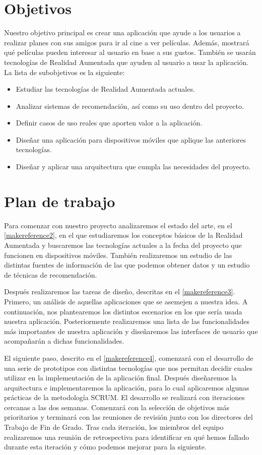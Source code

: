\section{Objetivos}
\label{makereference1.2}
Nuestro objetivo principal es crear una aplicación que ayude a los usuarios a
realizar planes con sus amigos para ir al cine a ver películas. Además,
mostrará qué películas pueden interesar al usuario en base a sus gustos.
También se usarán tecnologías de Realidad Aumentada que ayuden al usuario a usar
la aplicación.
La lista de subobjetivos es la siguiente:
\begin{itemize}  
    \item Estudiar las tecnologías de Realidad Aumentada actuales.
    \item Analizar sistemas de recomendación, así como su uso dentro del
     proyecto.
    \item Definir casos de uso reales que aporten valor a la aplicación.
    \item Diseñar una aplicación para dispositivos móviles que aplique las
     anteriores tecnologías.
    \item Diseñar y aplicar una arquitectura que cumpla las necesidades del
     proyecto.
\end{itemize}

\section{Plan de trabajo}
\label{makereference1.3}

Para comenzar con nuestro proyecto analizaremos el estado del arte, en el
 \autoref{makereference2}, en el que estudiaremos los conceptos básicos de la
 Realidad Aumentada y buscaremos las tecnologías actuales a la fecha del proyecto
 que funcionen en dispositivos móviles. También realizaremos un estudio de las distintas
 fuentes de información de las que podemos obtener datos y un estudio de
 técnicas de recomendación.

Después realizaremos las tareas de diseño, descritas en el
 \autoref{makereference3}. Primero, un análisis de aquellas aplicaciones que se
 asemejen a nuestra idea. A continuación, nos plantearemos los distintos
 escenarios en los que sería usada nuestra aplicación. Posteriormente
 realizaremos una lista de las funcionalidades más importantes de nuestra
 aplicación y diseñaremos las interfaces de usuario que acompañarán a dichas
 funcionalidades. 
   
El siguiente paso, descrito en el \autoref{makereference4}, comenzará con
 el desarrollo de una serie de prototipos con distintas tecnologías que nos permitan
 decidir cuales utilizar en la implementación de la aplicación final. Después diseñaremos la
 arquitectura e implementaremos la aplicación, para lo cual aplicaremos algunas
 prácticas de la metodología SCRUM. El desarrollo se realizará con iteraciones
 cercanas a las dos semanas. Comenzará con la selección de objetivos más
 prioritarios y terminará con las reuniones de revisión junto con los directores
 del Trabajo de Fin de Grado. Tras cada iteración, los miembros del equipo
 realizaremos una reunión de retrospectiva para identificar en qué hemos fallado
 durante esta iteración y cómo podemos mejorar para la siguiente.


